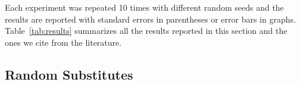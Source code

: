 

Each experiment was repeated 10 times with different random seeds and
the results are reported with standard errors in parentheses or error
bars in graphs.  Table~\ref{tab:results} summarizes all the results
reported in this section and the ones we cite from the literature.

\subsection{Random Substitutes}\label{sec:wordsub}
